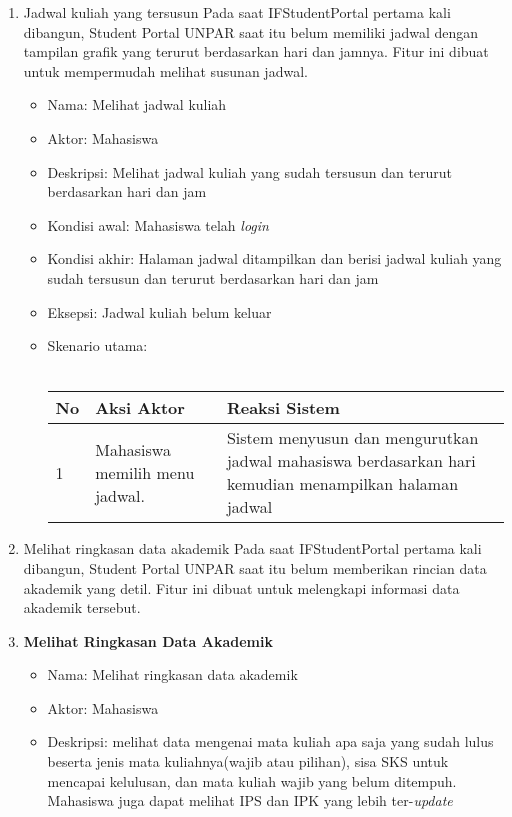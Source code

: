 \begin{enumerate}
\begin{itemize}
		\end{itemize}
    \item Jadwal kuliah yang tersusun
    Pada saat IFStudentPortal pertama kali dibangun, Student Portal UNPAR saat itu belum memiliki jadwal dengan tampilan grafik yang terurut berdasarkan hari dan jamnya. Fitur ini dibuat untuk mempermudah melihat susunan jadwal. 
    \begin{itemize}
			\item Nama: Melihat jadwal kuliah
			\item Aktor: Mahasiswa
			\item Deskripsi: Melihat jadwal kuliah yang sudah tersusun dan terurut berdasarkan hari dan jam
			\item Kondisi awal: Mahasiswa telah \textit{login}
			\item Kondisi akhir: Halaman jadwal ditampilkan dan berisi jadwal kuliah yang sudah tersusun dan terurut berdasarkan hari dan jam
			\item Eksepsi: Jadwal kuliah belum keluar
			\item Skenario utama: \\ \\
				\begin{tabular}{|p{0.5cm} |p{6cm}| p{6cm}|}
						\hline
							No 	& Aksi Aktor & Reaksi Sistem \\ \hline
							1 	& Mahasiswa memilih menu jadwal. 	&	Sistem menyusun dan mengurutkan jadwal mahasiswa berdasarkan hari kemudian menampilkan halaman jadwal \\ \hline 
						\end{tabular} 
		\end{itemize}
    \item Melihat ringkasan data akademik
    Pada saat IFStudentPortal pertama kali dibangun, Student Portal UNPAR saat itu belum memberikan rincian data akademik yang detil. Fitur ini dibuat untuk melengkapi informasi data akademik tersebut.
    \item \textbf{Melihat Ringkasan Data Akademik}
		\begin{itemize}
			\item Nama: Melihat ringkasan data akademik
			\item Aktor: Mahasiswa
			\item Deskripsi: melihat data mengenai mata kuliah apa saja yang sudah lulus beserta jenis mata kuliahnya(wajib atau pilihan), sisa SKS untuk mencapai kelulusan, dan mata kuliah wajib yang belum ditempuh. Mahasiswa juga dapat melihat IPS dan IPK yang lebih ter-\textit{update}

\end{itemize}
\end{enumerate}
